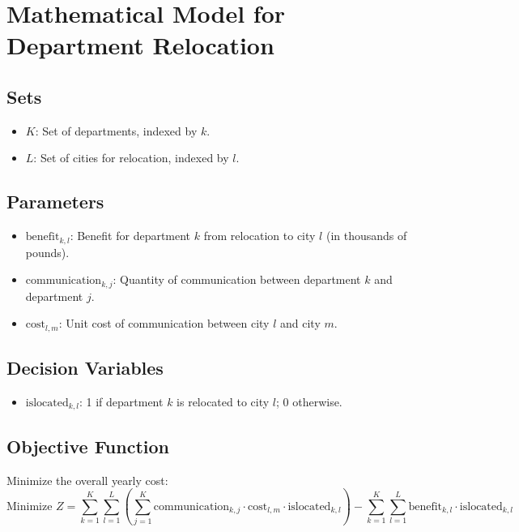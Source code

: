 \documentclass{article}
\begin{document}
\section*{Mathematical Model for Department Relocation}

\subsection*{Sets}
\begin{itemize}
    \item \( K \): Set of departments, indexed by \( k \).
    \item \( L \): Set of cities for relocation, indexed by \( l \).
\end{itemize}

\subsection*{Parameters}
\begin{itemize}
    \item \( \text{benefit}_{k, l} \): Benefit for department \( k \) from relocation to city \( l \) (in thousands of pounds).
    \item \( \text{communication}_{k, j} \): Quantity of communication between department \( k \) and department \( j \).
    \item \( \text{cost}_{l, m} \): Unit cost of communication between city \( l \) and city \( m \).
\end{itemize}

\subsection*{Decision Variables}
\begin{itemize}
    \item \( \text{islocated}_{k, l} \): 1 if department \( k \) is relocated to city \( l \); 0 otherwise.
\end{itemize}

\subsection*{Objective Function}
Minimize the overall yearly cost:
\[
\text{Minimize } Z = \sum_{k=1}^{K} \sum_{l=1}^{L} \left( \sum_{j=1}^{K} \text{communication}_{k, j} \cdot \text{cost}_{l, m} \cdot \text{islocated}_{k, l} \right) - \sum_{k=1}^{K} \sum_{l=1}^{L} \text{benefit}_{k, l} \cdot \text{islocated}_{k, l}
\]
\end{document}
